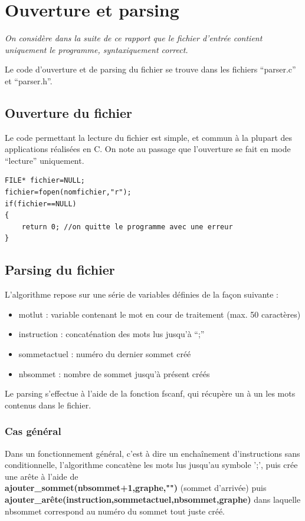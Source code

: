 \documentclass[a4paper,11pt]{article}
\begin{document}
	\section{Ouverture et parsing}
		\textit{On considère dans la suite de ce rapport que le fichier d'entrée contient uniquement le programme, syntaxiquement correct.}
		
		Le code d'ouverture et de parsing du fichier se trouve dans les fichiers ``parser.c'' et ``parser.h''.
		\subsection{Ouverture du fichier}
		Le code permettant la lecture du fichier est simple, et commun à la plupart des applications réalisées en C. On note au passage que l'ouverture se fait en mode ``lecture'' uniquement.
		\begin{lstlisting}
FILE* fichier=NULL;
fichier=fopen(nomfichier,"r");
if(fichier==NULL)
{
	return 0; //on quitte le programme avec une erreur
}
		\end{lstlisting}
		\subsection{Parsing du fichier}
		L'algorithme repose sur une série de variables définies de la façon suivante :
		\begin{itemize}
		\item motlut : variable contenant le mot en cour de traitement (max. 50 caractères)
		\item instruction : concaténation des mots lus jusqu'à ``;''
		\item sommetactuel : numéro du dernier sommet créé
		\item nbsommet : nombre de sommet jusqu'à présent créés
		\end{itemize}
		Le parsing s'effectue à l'aide de la fonction fscanf, qui récupère un à un les mots contenus dans le fichier.
		\subsubsection{Cas général}
		Dans un fonctionnement général, c'est à dire un enchaînement d'instructions sans conditionnelle, l'algorithme concatène les mots lus jusqu'au symbole ';', puis crée une arête à l'aide de \\\textbf{ajouter\_sommet(nbsommet+1,graphe,"")} (sommet d'arrivée) puis \\\textbf{ajouter\_arête(instruction,sommetactuel,nbsommet,graphe)} dans laquelle nbsommet correspond au numéro du sommet tout juste créé.
\end{document}
